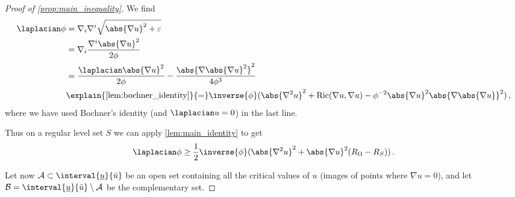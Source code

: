 \documentclass[titlepage,numbers=noenddot,oneside,%
cleardoublepage=empty,paper=a4,fontsize=11pt,%
english,%
]{scrartcl}
\newcommand*{\mathcomma}{\,,}
\newcommand*{\mathfullstop}{\,.}
\newcommand{\Ricci}{\mathrm{Ric}} %
\begin{document}
{\begin{proof}[Proof of \cref{prop:main_inequality}]
    We find
    \begin{equation}\label{eq:main_inequality_applied_bochner}
        \begin{aligned}[b]
            \laplacian \phi&=\nabla_i \nabla^i \sqrt{\abs{\nabla u}^2+\varepsilon}\\
            &=\nabla_i \frac{\nabla^i \abs{\nabla u}^2}{2\phi}\\
            &=\frac{\laplacian \abs{\nabla u}^2}{2\phi}-\frac{\abs{\nabla\abs{\nabla u}^2}^2}{4\phi^3}\\
            &\explain{\text{\cref{lem:bochner_identity}}}{=}\inverse{\phi}(\abs{\nabla^2 u}^2+\Ricci(\nabla u,\nabla u)-\phi^{-2}\abs{\nabla u}^2\abs{\nabla \abs{\nabla u}}^2)\mathcomma
        \end{aligned}
    \end{equation}
    where we have used Bochner's identity (and \( \laplacian u=0 \)) in the last line.

    Thus on a regular level set \( S \) we can apply \cref{lem:main_identity} to get
    \begin{equation}
        \laplacian \phi\geq \frac{1}{2}\inverse{\phi}(\abs{\nabla^2 u}^2+\abs{\nabla u}^2(R_\Omega-R_S))\mathfullstop\label{eq:main_inequality_applied_main_identity}
    \end{equation}

    Let now \( \mathcal{A}\subset \interval{\minu}{\maxu} \) be an open set containing all the critical values of \( u \) (images of points where \( \nabla u=0 \)), and let \( \mathcal{B}=\interval{\minu}{\maxu}\setminus \mathcal{A} \) be the complementary set.


\end{proof}}
\end{document}
